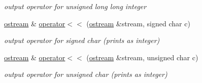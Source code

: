 \begin{DoxyCompactItemize}
\begin{DoxyCompactList}\small\item\em output operator for unsigned long long integer \end{DoxyCompactList}\item 
\hyperlink{classhwlib_1_1ostream}{ostream} \& \hyperlink{classhwlib_1_1ostream_a62d3d656e6a5021fc4a6aa6940b5641e}{operator$<$$<$} (\hyperlink{classhwlib_1_1ostream}{ostream} \&stream, signed char c)\hypertarget{classhwlib_1_1ostream_a62d3d656e6a5021fc4a6aa6940b5641e}{}\label{classhwlib_1_1ostream_a62d3d656e6a5021fc4a6aa6940b5641e}

\begin{DoxyCompactList}\small\item\em output operator for signed char (prints as integer) \end{DoxyCompactList}\item 
\hyperlink{classhwlib_1_1ostream}{ostream} \& \hyperlink{classhwlib_1_1ostream_a3fea1f54c018fe926d9c7ee25ebd917a}{operator$<$$<$} (\hyperlink{classhwlib_1_1ostream}{ostream} \&stream, unsigned char c)\hypertarget{classhwlib_1_1ostream_a3fea1f54c018fe926d9c7ee25ebd917a}{}\label{classhwlib_1_1ostream_a3fea1f54c018fe926d9c7ee25ebd917a}

\begin{DoxyCompactList}\small\item\em output operator for unsigned char (prints as integer) \end{DoxyCompactList}\end{DoxyCompactItemize}
